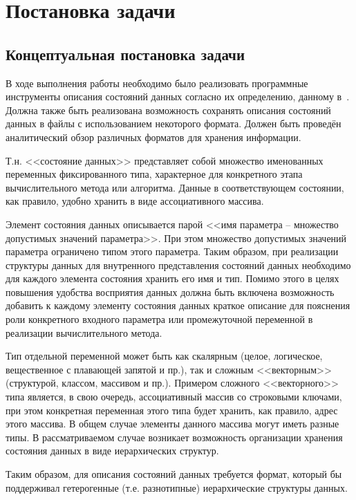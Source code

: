 \chapter{Постановка задачи}
\section{Концептуальная постановка задачи}
В ходе выполнения работы необходимо было реализовать программные инструменты описания состояний данных согласно их определению, данному в~\cite{SokolovPershin2018}. Должна также быть реализована возможность сохранять описания состояний данных в файлы с использованием некоторого формата. Должен быть проведён аналитический обзор различных форматов для хранения информации.

Т.н. <<состояние данных>>\cite{SokolovPershin2018} представляет собой множество именованных переменных фиксированного типа, характерное для конкретного этапа вычислительного метода или алгоритма. Данные в соответствующем состоянии, как правило, удобно хранить в виде ассоциативного массива.



Элемент состояния данных описывается парой <<имя параметра -- множество допустимых значений параметра>>\cite{SokolovPershin2018}. При этом множество допустимых значений параметра ограничено типом этого параметра. Таким образом, при реализации структуры данных для внутренного представления состояний данных необходимо для каждого элемента состояния хранить его имя и тип. Помимо этого в целях повышения удобства восприятия данных должна быть включена возможность добавить к каждому элементу состояния данных краткое описание для пояснения роли конкретного входного параметра или промежуточной переменной в реализации вычислительного метода.

Тип отдельной переменной может быть как скалярным (целое, логическое, вещественное с плавающей запятой и пр.), так и сложным <<векторным>> (структурой, классом, массивом и пр.). Примером сложного <<векторного>> типа является, в свою очередь, ассоциативный массив со строковыми ключами, при этом конкретная переменная этого типа будет хранить, как правило, адрес этого массива. В общем случае элементы данного массива могут иметь разные типы. В рассматриваемом случае возникает возможность организации хранения состояния данных в виде иерархических структур.

Таким образом, для описания состояний данных требуется формат, который бы поддерживал гетерогенные (т.е. разнотипные) иерархические структуры данных.


